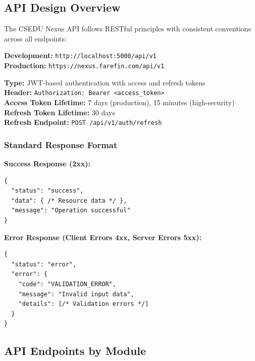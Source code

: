 \documentclass[12pt,a4paper]{article}
\begin{document}
\subsection{API Design Overview}

The CSEDU Nexus API follows RESTful principles with consistent conventions across all endpoints:

\begin{tcolorbox}[colback=LightBlue, colframe=Teal, title=\textbf{API Base URLs}, fonttitle=\bfseries]
\textbf{Development:} \texttt{http://localhost:5000/api/v1}\\
\textbf{Production:} \texttt{https://nexus.farefin.com/api/v1}
\end{tcolorbox}

\vspace{8pt}

\begin{tcolorbox}[colback=LightGold, colframe=Gold, title=\textbf{Authentication}, fonttitle=\bfseries]
\textbf{Type:} JWT-based authentication with access and refresh tokens\\
\textbf{Header:} \texttt{Authorization: Bearer <access\_token>}\\
\textbf{Access Token Lifetime:} 7 days (production), 15 minutes (high-security)\\
\textbf{Refresh Token Lifetime:} 30 days\\
\textbf{Refresh Endpoint:} \texttt{POST /api/v1/auth/refresh}
\end{tcolorbox}

\vspace{8pt}

\subsubsection{Standard Response Format}

\textbf{Success Response (2xx):}
\begin{lstlisting}
{
  "status": "success",
  "data": { /* Resource data */ },
  "message": "Operation successful"
}
\end{lstlisting}

\textbf{Error Response (Client Errors 4xx, Server Errors 5xx):}
\begin{lstlisting}
{
  "status": "error",
  "error": {
    "code": "VALIDATION_ERROR",
    "message": "Invalid input data",
    "details": [/* Validation errors */]
  }
}
\end{lstlisting}

\subsection{API Endpoints by Module}
\end{document}
